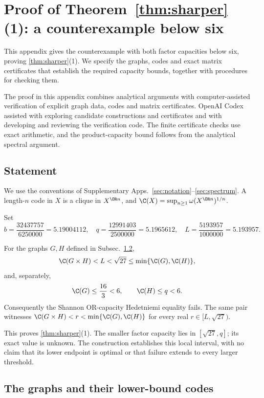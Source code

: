 \section{Proof of Theorem~\ref*{thm:sharper}(1): a counterexample below six}\label{sec:subsixproof}

This appendix gives the counterexample with both factor capacities
below six, proving \cref{thm:sharper}(1). We specify the graphs, codes
and exact matrix certificates that establish the required capacity
bounds, together with procedures for checking them.

The proof in this appendix combines analytical arguments with
computer-assisted verification of explicit graph data, codes and matrix
certificates. OpenAI Codex assisted with exploring candidate constructions
and certificates and with developing and reviewing the verification code.
The finite certificate checks use exact arithmetic, and the
product-capacity bound follows from the analytical spectral argument.

\subsection{Statement}

We use the conventions of Supplementary Apps.~\ref{sec:notation}--\ref{sec:spectrum}.
A length-$n$ code in $X$ is a clique in $X^{\OR n}$, and
$\C(X)=\sup_{n\ge1}\omega(X^{\OR n})^{1/n}$.

Set
\[
 b=\frac{32437757}{6250000}=5.19004112,\quad
 q=\frac{12991403}{2500000}=5.1965612,\quad
 L=\frac{5193957}{1000000}=5.193957.
\]
\begin{proposition}\label{subsix:thm:main}
For the graphs \(G,H\) defined in Subsec.~\ref{subsix:sec:graphs},
\[
 \C(G\times H)<L<\sqrt{27}\leq\min\{\C(G),\C(H)\},
\]
and, separately,
\[
 \C(G)\leq\frac{16}{3}<6,\qquad \C(H)\leq q<6.
\]
Consequently the Shannon OR-capacity Hedetniemi equality fails.
The same pair witnesses
\(\C(G\times H)<r<\min\{\C(G),\C(H)\}\) for every real
\(r\in[L,\sqrt{27})\).
\end{proposition}
This proves \cref{thm:sharper}(1).
The smaller factor capacity lies in $[\sqrt{27},q]$;
its exact value is unknown. The construction establishes this local
interval, with no claim that its lower endpoint is optimal or that
failure extends to every larger threshold.

\subsection{The graphs and their lower-bound codes}\label{subsix:sec:graphs}

